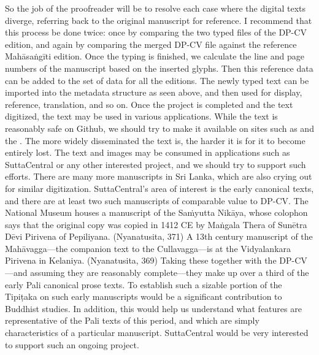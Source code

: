 {}So the job of the proofreader will be to resolve each case where the digital texts diverge, referring back to the original manuscript for reference.\markdownRendererInterblockSeparator
{}I recommend that this process be done twice: once by comparing the two typed files of the DP-CV edition, and again by comparing the merged DP-CV file against the reference Mahāsaṅgīti edition.\markdownRendererInterblockSeparator
{}Once the typing is finished, we calculate the line and page numbers of the manuscript based on the inserted glyphs. Then this reference data can be added to the set of data for all the editions. The newly typed text can be imported into the metadata structure as seen above, and then used for display, reference, translation, and so on.\markdownRendererInterblockSeparator
{}\markdownRendererInterblockSeparator
{}Once the project is completed and the text digitized, the text may be used in various applications. While the text is reasonably safe on Github, we should try to make it available on sites such as  and the . The more widely disseminated the text is, the harder it is for it to become entirely lost.\markdownRendererInterblockSeparator
{}The text and images may be consumed in applications such as SuttaCentral or any other interested project, and we should try to support such efforts.\markdownRendererInterblockSeparator
{}There are many more manuscripts in Sri Lanka, which are also crying out for similar digitization. SuttaCentral’s area of interest is the early canonical texts, and there are at least two such manuscripts of comparable value to DP-CV.\markdownRendererInterblockSeparator
{}\markdownRendererUlBeginTight
\markdownRendererUlItem The National Museum houses a manuscript of the Saṁyutta Nikāya, whose colophon says that the original copy was copied in 1412 CE by Maṅgala Thera of Sunētra Dēvi Pirivena of Pepiliyana. (Nyanatusita, 371)\markdownRendererUlItemEnd 
\markdownRendererUlItem A 13th century manuscript of the Mahāvagga—the companion text to the Cullavagga—is at the Vidyalankara Pirivena in Kelaniya. (Nyanatusita, 369)\markdownRendererUlItemEnd 
\markdownRendererUlEndTight \markdownRendererInterblockSeparator
{}Taking these together with the DP-CV—and assuming they are reasonably complete—they make up over a third of the early Pali canonical prose texts. To establish such a sizable portion of the Tipiṭaka on such early manuscripts would be a significant contribution to Buddhist studies. In addition, this would help us understand what features are representative of the Pali texts of this period, and which are simply characteristics of a particular manuscript. SuttaCentral would be very interested to support such an ongoing project.\markdownRendererInterblockSeparator
